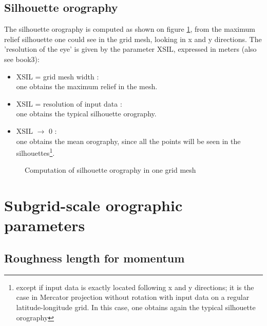 \subsection{Silhouette orography}
The silhouette orography is computed as shown on figure \ref{silhouette},
from the maximum relief silhouette one could see in the grid mesh,
looking in x and y
directions. The 'resolution of the eye' is given by the parameter XSIL,
expressed in meters (also see book3):
\begin{itemize}
\item XSIL = grid mesh width :\\one obtains the maximum relief in the mesh.
\item XSIL = resolution of input data :\\one obtains the typical silhouette orography.
\item XSIL $\rightarrow$ 0 :\\one obtains the mean orography, since all the points will
be seen in the silhouettes\footnote{except if input data is exactly located following
x and y directions; it is the case in Mercator projection without rotation
with input data on a regular latitude-longitude grid. In this case, one obtains
again the typical silhouette orography}.
\end{itemize}
\begin{figure}
\hspace*{0.cm}
\caption{Computation of silhouette orography in one grid mesh\label{silhouette}}
\end{figure}

\newpage

\section{Subgrid-scale orographic parameters}

\subsection{Roughness length for momentum}

